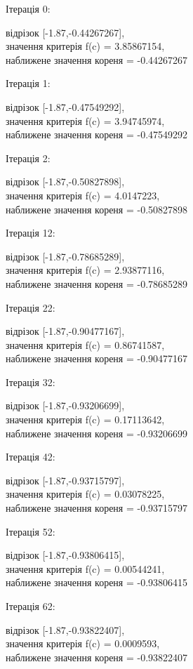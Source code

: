 \documentclass[a4paper,14pt]{extarticle} %
\begin{document}
Ітерація 0: \parbox[t]{12cm}{ відрізок [-1.87,-0.44267267], \\
            значення критерія f(c) = 3.85867154, \\
            наближене значення кореня = -0.44267267 \\ } \par
Ітерація 1: \parbox[t]{12cm}{ відрізок [-1.87,-0.47549292], \\
            значення критерія f(c) = 3.94745974, \\
            наближене значення кореня = -0.47549292 \\ } \par
Ітерація 2: \parbox[t]{12cm}{ відрізок [-1.87,-0.50827898], \\
            значення критерія f(c) = 4.0147223, \\
            наближене значення кореня = -0.50827898 \\ } \par
Ітерація 12: \parbox[t]{12cm}{ відрізок [-1.87,-0.78685289], \\
            значення критерія f(c) = 2.93877116, \\
            наближене значення кореня = -0.78685289 \\ } \par
Ітерація 22: \parbox[t]{12cm}{ відрізок [-1.87,-0.90477167], \\
            значення критерія f(c) = 0.86741587, \\
            наближене значення кореня = -0.90477167 \\ } \par
Ітерація 32: \parbox[t]{12cm}{ відрізок [-1.87,-0.93206699], \\
            значення критерія f(c) = 0.17113642, \\
            наближене значення кореня = -0.93206699 \\ } \par
Ітерація 42: \parbox[t]{12cm}{ відрізок [-1.87,-0.93715797], \\
            значення критерія f(c) = 0.03078225, \\
            наближене значення кореня = -0.93715797 \\ } \par
Ітерація 52: \parbox[t]{12cm}{ відрізок [-1.87,-0.93806415], \\
            значення критерія f(c) = 0.00544241, \\
            наближене значення кореня = -0.93806415 \\ } \par
Ітерація 62: \parbox[t]{12cm}{ відрізок [-1.87,-0.93822407], \\
            значення критерія f(c) = 0.0009593, \\
            наближене значення кореня = -0.93822407 \\ } \par
\end{document}
